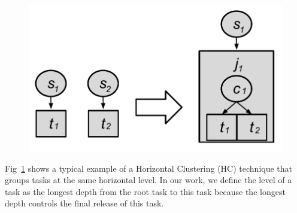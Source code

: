 \documentclass[final]{IEEEtran}
\begin{document}
\begin{figure}[htb]
\centering
 \includegraphics[width=0.65\linewidth]{figure/hc.pdf}
  \label{fig:hc}
  \vspace{-15pt}
\end{figure}


Fig~\ref{fig:hc} shows a typical example of a Horizontal Clustering (HC) technique that groups tasks at the same horizontal level. In our work, we define the level of a task as the longest depth from the root task to this task because the longest depth controls the final release of this task. 
\end{document}
